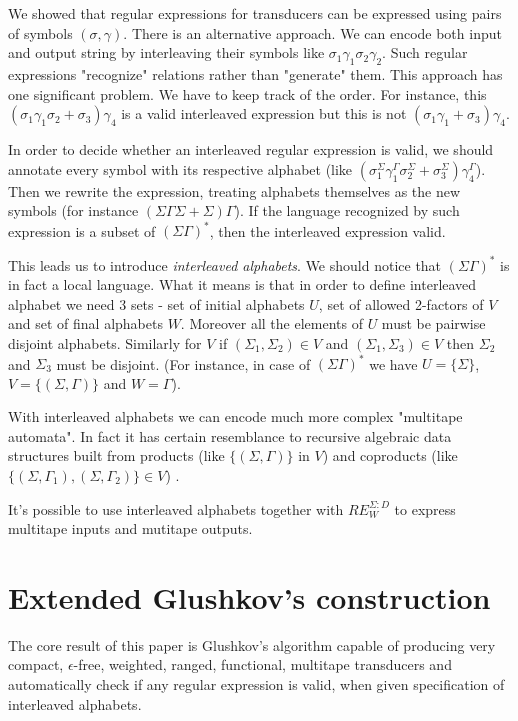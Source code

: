 We showed that regular expressions for transducers can be expressed using pairs of symbols $(\sigma,\gamma)$. There is an alternative approach. We can encode both input and output string by interleaving their symbols like $\sigma_1\gamma_1\sigma_2\gamma_2$. Such regular expressions "recognize" relations rather than "generate" them. This approach has one significant problem. We have to keep track of the order. For instance, this $(\sigma_1\gamma_1\sigma_2 + \sigma_3)\gamma_4$ is a valid interleaved expression but this is not $(\sigma_1\gamma_1 + \sigma_3)\gamma_4$.

In order to decide whether an interleaved regular expression is valid, we should annotate every symbol with its respective alphabet (like $(\sigma_1^\Sigma\gamma_1^\Gamma\sigma_2^\Sigma + \sigma_3^\Sigma)\gamma_4^\Gamma$). Then we rewrite the expression, treating alphabets themselves as the new symbols (for instance $(\Sigma\Gamma\Sigma + \Sigma)\Gamma$). If the language recognized by such expression is a subset of $(\Sigma\Gamma)^*$, then the interleaved expression valid. 

This leads us to introduce \textit{interleaved alphabets}. We should notice that $(\Sigma\Gamma)^*$ is in fact a local language. What it means is that in order to define interleaved alphabet we need 3 sets - set of initial alphabets $U$, set of allowed 2-factors of $V$ and set of final alphabets $W$. Moreover all the elements of $U$ must be pairwise disjoint alphabets. Similarly for $V$ if $(\Sigma_1,\Sigma_2)\in V$ and $(\Sigma_1,\Sigma_3)\in V$  then $\Sigma_2$ and $\Sigma_3$ must be disjoint. (For instance, in case of $(\Sigma\Gamma)^*$  we have $U=\{\Sigma\}$, $V=\{(\Sigma,\Gamma)\}$ and $W=\Gamma$). 

With interleaved alphabets we can encode much more complex "multitape automata". In fact it has certain resemblance to recursive algebraic data structures built from products (like $\{(\Sigma,\Gamma)\}$ in $V$) and coproducts (like $\{(\Sigma,\Gamma_1),(\Sigma,\Gamma_2)\}\in V$) .

It's possible to use interleaved alphabets together with $RE_W^{\Sigma:D}$ to express multitape inputs and mutitape outputs.


\section{Extended Glushkov's construction}

The core result of this paper is Glushkov's algorithm capable of producing very compact, $\epsilon$-free, weighted, ranged, functional, multitape transducers and automatically check if any regular expression is valid, when given specification of interleaved alphabets.

